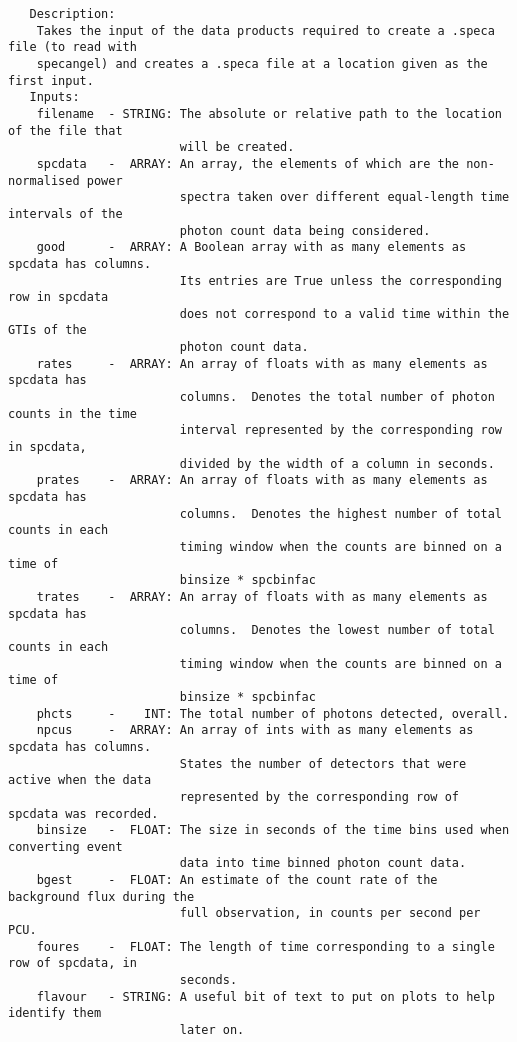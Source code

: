 \begin{verbatim}
   Description:
    Takes the input of the data products required to create a .speca file (to read with
    specangel) and creates a .speca file at a location given as the first input.
   Inputs:
    filename  - STRING: The absolute or relative path to the location of the file that
                        will be created.
    spcdata   -  ARRAY: An array, the elements of which are the non-normalised power
                        spectra taken over different equal-length time intervals of the
                        photon count data being considered.
    good      -  ARRAY: A Boolean array with as many elements as spcdata has columns.
                        Its entries are True unless the corresponding row in spcdata
                        does not correspond to a valid time within the GTIs of the 
                        photon count data.
    rates     -  ARRAY: An array of floats with as many elements as spcdata has
                        columns.  Denotes the total number of photon counts in the time
                        interval represented by the corresponding row in spcdata,
                        divided by the width of a column in seconds.
    prates    -  ARRAY: An array of floats with as many elements as spcdata has
                        columns.  Denotes the highest number of total counts in each
                        timing window when the counts are binned on a time of
                        binsize * spcbinfac
    trates    -  ARRAY: An array of floats with as many elements as spcdata has
                        columns.  Denotes the lowest number of total counts in each
                        timing window when the counts are binned on a time of
                        binsize * spcbinfac
    phcts     -    INT: The total number of photons detected, overall.
    npcus     -  ARRAY: An array of ints with as many elements as spcdata has columns.
                        States the number of detectors that were active when the data
                        represented by the corresponding row of spcdata was recorded.
    binsize   -  FLOAT: The size in seconds of the time bins used when converting event
                        data into time binned photon count data.
    bgest     -  FLOAT: An estimate of the count rate of the background flux during the
                        full observation, in counts per second per PCU.
    foures    -  FLOAT: The length of time corresponding to a single row of spcdata, in
                        seconds.
    flavour   - STRING: A useful bit of text to put on plots to help identify them
                        later on.

\end{verbatim}
